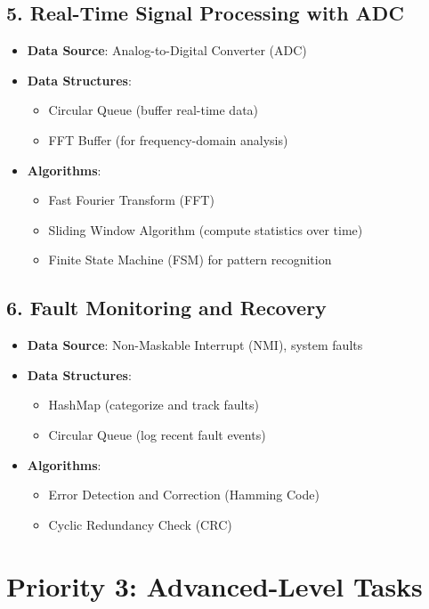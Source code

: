 \documentclass{article}
\begin{document}
\subsection{5. Real-Time Signal Processing with ADC}
\begin{itemize}
    \item \textbf{Data Source}: Analog-to-Digital Converter (ADC)
    \item \textbf{Data Structures}:
    \begin{itemize}
        \item Circular Queue (buffer real-time data)
        \item FFT Buffer (for frequency-domain analysis)
    \end{itemize}
    \item \textbf{Algorithms}:
    \begin{itemize}
        \item Fast Fourier Transform (FFT)
        \item Sliding Window Algorithm (compute statistics over time)
        \item Finite State Machine (FSM) for pattern recognition
    \end{itemize}
\end{itemize}

\subsection{6. Fault Monitoring and Recovery}
\begin{itemize}
    \item \textbf{Data Source}: Non-Maskable Interrupt (NMI), system faults
    \item \textbf{Data Structures}:
    \begin{itemize}
        \item HashMap (categorize and track faults)
        \item Circular Queue (log recent fault events)
    \end{itemize}
    \item \textbf{Algorithms}:
    \begin{itemize}
        \item Error Detection and Correction (Hamming Code)
        \item Cyclic Redundancy Check (CRC)
    \end{itemize}
\end{itemize}

\section{Priority 3: Advanced-Level Tasks}
\end{document}
